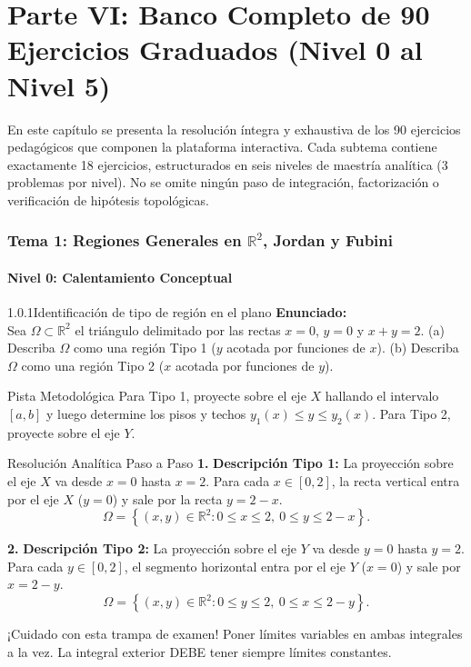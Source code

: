 \documentclass[11pt,a4paper]{article}
\begin{document}
\part*{Parte VI: Banco Completo de 90 Ejercicios Graduados (Nivel 0 al Nivel 5)}
En este capítulo se presenta la resolución íntegra y exhaustiva de los 90 ejercicios pedagógicos que componen la plataforma interactiva. Cada subtema contiene exactamente 18 ejercicios, estructurados en seis niveles de maestría analítica (3 problemas por nivel). No se omite ningún paso de integración, factorización o verificación de hipótesis topológicas.

\section{Tema 1: Regiones Generales en $\mathbb{R}^2$, Jordan y Fubini}

\subsection{Nivel 0: Calentamiento Conceptual}

\begin{nivelbox}{1.0.1}{Identificación de tipo de región en el plano}
\textbf{Enunciado:}\\
Sea $\Omega \subset \mathbb{R}^2$ el triángulo delimitado por las rectas $x = 0$, $y = 0$ y $x + y = 2$.
(a) Describa $\Omega$ como una región Tipo 1 ($y$ acotada por funciones de $x$).
(b) Describa $\Omega$ como una región Tipo 2 ($x$ acotada por funciones de $y$).

\begin{observacionbox}{Pista Metodológica}
Para Tipo 1, proyecte sobre el eje $X$ hallando el intervalo $[a,b]$ y luego determine los pisos y techos $y_1(x) \le y \le y_2(x)$. Para Tipo 2, proyecte sobre el eje $Y$.
\end{observacionbox}

\begin{ejerciciobox}{Resolución Analítica Paso a Paso}
\smallskip\noindent\textbf{1.} \textbf{Descripción Tipo 1:}
La proyección sobre el eje $X$ va desde $x = 0$ hasta $x = 2$. Para cada $x \in [0, 2]$, la recta vertical entra por el eje $X$ ($y = 0$) y sale por la recta $y = 2 - x$.
\[\Omega = \left\{ (x,y) \in \mathbb{R}^2 : 0 \le x \le 2, \ 0 \le y \le 2 - x \right\}.\]

\smallskip\noindent\textbf{2.} \textbf{Descripción Tipo 2:}
La proyección sobre el eje $Y$ va desde $y = 0$ hasta $y = 2$. Para cada $y \in [0, 2]$, el segmento horizontal entra por el eje $Y$ ($x = 0$) y sale por $x = 2 - y$.
\[\Omega = \left\{ (x,y) \in \mathbb{R}^2 : 0 \le y \le 2, \ 0 \le x \le 2 - y \right\}.\]
\end{ejerciciobox}

\begin{errorbox}{¡Cuidado con esta trampa de examen!}
Poner límites variables en ambas integrales a la vez. La integral exterior DEBE tener siempre límites constantes.
\end{errorbox}
\end{nivelbox}
\bigskip
\end{document}
